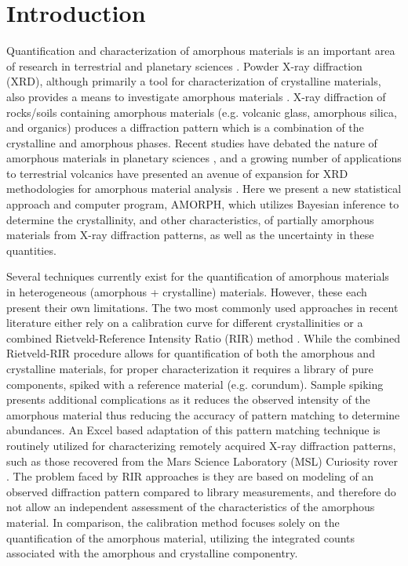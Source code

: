 \documentclass[preprint, a4paper]{elsarticle}
\begin{document}
\section{Introduction}
Quantification and characterization of amorphous materials is an important area of research in
terrestrial and planetary sciences \citep[e.g.,][]{schmidt2009, dehouck2014, wall2014, morris2016, zorn2017}.
Powder X-ray diffraction (XRD), although primarily a tool for characterization of crystalline materials,
also provides a means to investigate amorphous materials \citep[e.g.,][]{rowe2012, achilles2013}. X-ray diffraction of rocks/soils containing amorphous materials (e.g. volcanic
glass, amorphous silica, and organics) produces a diffraction pattern which is a combination of the
crystalline and amorphous phases. Recent studies have debated the nature of amorphous materials in
planetary sciences \citep[e.g.][]{schmidt2009, dehouck2014}, and a growing number of
applications to terrestrial volcanics have presented an avenue of expansion for XRD methodologies
for amorphous material analysis \citep{ellis2015, kanakiya2017, zorn2017}.
Here we present a new statistical approach and computer program, AMORPH, which utilizes Bayesian inference to determine
the crystallinity, and other characteristics, of partially amorphous materials from X-ray diffraction patterns, as well as the uncertainty in these quantities.

Several techniques currently exist for the quantification of amorphous materials in heterogeneous (amorphous + crystalline) materials. However, these
each present their own limitations. The two most commonly used approaches in recent literature
either rely on a calibration curve for different crystallinities \citep[calibration method;][]{ rowe2012} or a combined Rietveld-Reference Intensity Ratio (RIR) method \citep{gualtieri1996, gualtieri2000}. While the combined Rietveld-RIR procedure allows for quantification of both the amorphous 
and crystalline materials, for proper characterization it requires a library of pure components,
spiked with a reference material (e.g. corundum). Sample spiking presents additional complications
as it reduces the observed intensity of the amorphous material thus reducing the accuracy of
pattern matching to determine abundances. An Excel based adaptation of this pattern matching
technique \citep[FULLPAT;][]{chipera2002} is routinely utilized for characterizing remotely acquired X-ray
diffraction patterns, such as those recovered from the Mars Science Laboratory (MSL) Curiosity rover \citep{bish2013}. The problem faced by RIR approaches is they are based on modeling of an observed 
diffraction pattern compared to library measurements, and therefore do not allow an independent
assessment of the characteristics of the amorphous material. In comparison, the calibration method
focuses solely on the quantification of the amorphous material, utilizing the integrated counts
associated with the amorphous and crystalline componentry. 
\end{document}
